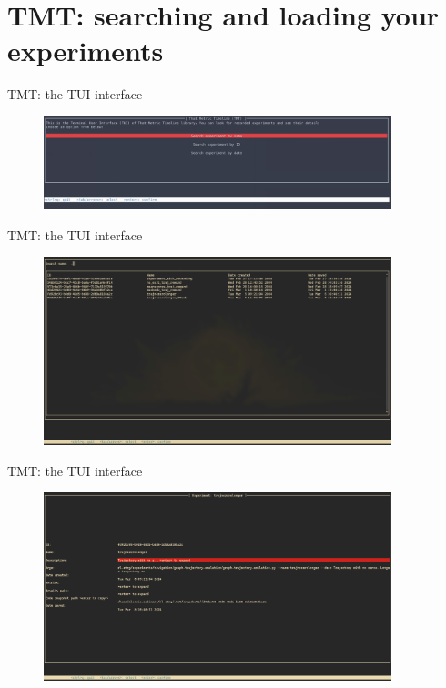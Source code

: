 \documentclass[aspectratio=169,xcolor={dvipsnames}]{beamer}
\begin{document}
  \section{TMT: searching and loading your experiments }
  \begin{frame}{TMT: the TUI interface}
   \begin{figure}
    \includegraphics[width=0.90\textwidth]{main_tui.png}
   \end{figure}
  \end{frame}
  \begin{frame}{TMT: the TUI interface}
   \begin{figure}
    \includegraphics[width=0.90\textwidth]{tmt_search.png}
   \end{figure}
  \end{frame}
  \begin{frame}{TMT: the TUI interface}
   \begin{figure}
    \includegraphics[width=0.90\textwidth]{detail_tui.png}
   \end{figure}
  \end{frame}
\end{document}
